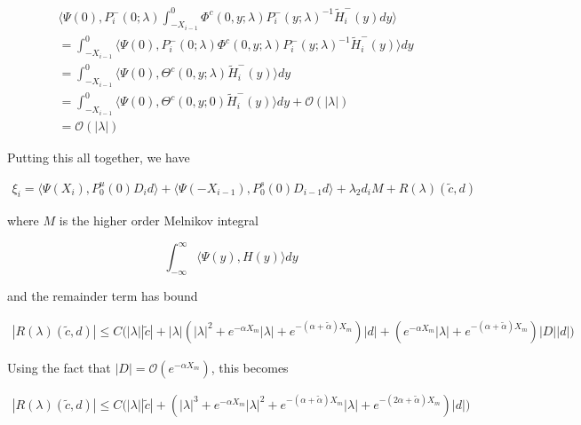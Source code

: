 \documentclass[12pt]{article}
\begin{document}
\begin{enumerate}
\begin{align*}
&\langle \Psi(0), P_i^-(0; \lambda)
\int_{-X_{i-1}}^0 \Phi^c(0, y; \lambda) P_i^-(y; \lambda)^{-1} \tilde{H}_i^-(y) dy \rangle \\
&= \int_{-X_{i-1}}^0 \langle \Psi(0), P_i^-(0; \lambda) \Phi^c(0, y; \lambda) P_i^-(y; \lambda)^{-1} \tilde{H}_i^-(y) \rangle dy \\
&= \int_{-X_{i-1}}^0 \langle \Psi(0), \Theta^c(0, y; \lambda) \tilde{H}_i^-(y) \rangle dy \\
&= \int_{-X_{i-1}}^0 \langle \Psi(0), \Theta^c(0, y; 0) \tilde{H}_i^-(y) \rangle dy + \mathcal{O}(|\lambda|) \\
&= \mathcal{O}(|\lambda|)
\end{align*}

\end{enumerate}

Putting this all together, we have

\begin{align*}
\xi_i = \langle \Psi(X_i), P_0^u(0) D_i d \rangle
+ \langle \Psi(-X_{i-1}), P_0^s(0) D_{i-1} d \rangle 
+ \lambda_2 d_i M + R(\lambda)(\tilde{c}, d)
\end{align*}

where $M$ is the higher order Melnikov integral

\[
\int_{-\infty}^\infty \langle \Psi(y), H(y) \rangle dy 
\]

and the remainder term has bound

\begin{align*}
|R(\lambda)(\tilde{c}, d)| \leq C \Big(
|\lambda||\tilde{c}| + |\lambda|(|\lambda|^2 + e^{-\alpha X_m}|\lambda| + e^{-(\alpha + \tilde{\alpha}) X_m})|d| + (e^{-\alpha X_m} |\lambda| + e^{-(\alpha + \tilde{\alpha}) X_m})|D||d|
 \Big)
\end{align*}

Using the fact that $|D| = \mathcal{O}(e^{-\alpha X_m})$, this becomes

\begin{align*}
|R(\lambda)(\tilde{c}, d)| \leq C \Big(
|\lambda||\tilde{c}| + (|\lambda|^3 + e^{-\alpha X_m}|\lambda|^2 + e^{-(\alpha + \tilde{\alpha}) X_m}|\lambda| + e^{-(2 \alpha + \tilde{\alpha}) X_m})|d|
 \Big)
\end{align*}
\end{document}
